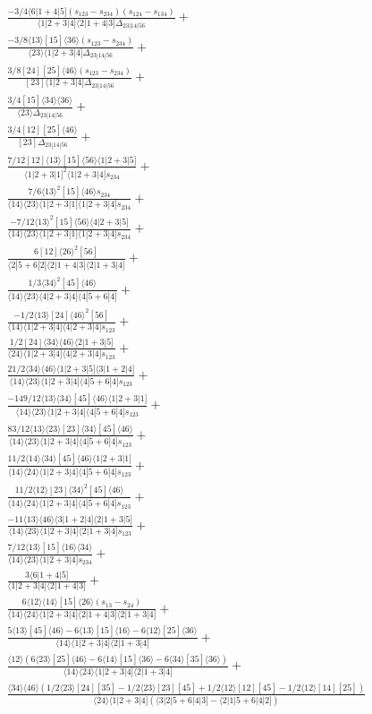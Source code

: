 \documentclass[varwidth, border=5pt]{standalone}
\begin{document}
\begin{my}
$\begin{gathered}
\scriptscriptstyle\frac{-3/4⟨6|1+4|5](s_{123}-s_{234})(s_{124}-s_{134})}{⟨1|2+3|4]⟨2|1+4|3]Δ_{23|14|56}}+\\
\scriptscriptstyle\frac{-3/8⟨13⟩[15]⟨36⟩(s_{123}-s_{234})}{⟨23⟩⟨1|2+3|4]Δ_{23|14|56}}+\\
\scriptscriptstyle\frac{3/8[24][25]⟨46⟩(s_{123}-s_{234})}{[23]⟨1|2+3|4]Δ_{23|14|56}}+\\
\scriptscriptstyle\frac{3/4[15]⟨34⟩⟨36⟩}{⟨23⟩Δ_{23|14|56}}+\\
\scriptscriptstyle\frac{3/4[12][25]⟨46⟩}{[23]Δ_{23|14|56}}+\\
\scriptscriptstyle\frac{7/12[12]⟨13⟩[15]⟨56⟩⟨1|2+3|5]}{⟨1|2+3|1]^2⟨1|2+3|4]s_{234}}+\\
\scriptscriptstyle\frac{7/6⟨13⟩^2[15]⟨46⟩s_{234}}{⟨14⟩⟨23⟩⟨1|2+3|1]⟨1|2+3|4]s_{234}}+\\
\scriptscriptstyle\frac{-7/12⟨13⟩^2[15]⟨56⟩⟨4|2+3|5]}{⟨14⟩⟨23⟩⟨1|2+3|1]⟨1|2+3|4]s_{234}}+\\
\scriptscriptstyle\frac{6[12]⟨26⟩^2[56]}{⟨2|5+6|2]⟨2|1+4|3]⟨2|1+3|4]}+\\
\scriptscriptstyle\frac{1/3⟨34⟩^2[45]⟨46⟩}{⟨14⟩⟨23⟩⟨4|2+3|4]⟨4|5+6|4]}+\\
\scriptscriptstyle\frac{-1/2⟨13⟩[24]⟨46⟩^2[56]}{⟨14⟩⟨1|2+3|4]⟨4|2+3|4]s_{123}}+\\
\scriptscriptstyle\frac{1/2[24]⟨34⟩⟨46⟩⟨2|1+3|5]}{⟨24⟩⟨1|2+3|4]⟨4|2+3|4]s_{123}}+\\
\scriptscriptstyle\frac{21/2⟨34⟩⟨46⟩⟨1|2+3|5]⟨3|1+2|4]}{⟨14⟩⟨23⟩⟨1|2+3|4]⟨4|5+6|4]s_{123}}+\\
\scriptscriptstyle\frac{-149/12⟨13⟩⟨34⟩[45]⟨46⟩⟨1|2+3|1]}{⟨14⟩⟨23⟩⟨1|2+3|4]⟨4|5+6|4]s_{123}}+\\
\scriptscriptstyle\frac{83/12⟨13⟩⟨23⟩[23]⟨34⟩[45]⟨46⟩}{⟨14⟩⟨23⟩⟨1|2+3|4]⟨4|5+6|4]s_{123}}+\\
\scriptscriptstyle\frac{11/2⟨14⟩⟨34⟩[45]⟨46⟩⟨1|2+3|1]}{⟨14⟩⟨24⟩⟨1|2+3|4]⟨4|5+6|4]s_{123}}+\\
\scriptscriptstyle\frac{11/2⟨12⟩[23]⟨34⟩^2[45]⟨46⟩}{⟨14⟩⟨24⟩⟨1|2+3|4]⟨4|5+6|4]s_{123}}+\\
\scriptscriptstyle\frac{-11⟨13⟩⟨46⟩⟨3|1+2|4]⟨2|1+3|5]}{⟨14⟩⟨23⟩⟨1|2+3|4]⟨2|1+3|4]s_{123}}+\\
\scriptscriptstyle\frac{7/12⟨13⟩[15]⟨16⟩⟨34⟩}{⟨14⟩⟨23⟩⟨1|2+3|4]s_{234}}+\\
\scriptscriptstyle\frac{3⟨6|1+4|5]}{⟨1|2+3|4]⟨2|1+4|3]}+\\
\scriptscriptstyle\frac{6⟨12⟩⟨14⟩[15]⟨26⟩(s_{13}-s_{24})}{⟨14⟩⟨24⟩⟨1|2+3|4]⟨2|1+4|3]⟨2|1+3|4]}+\\
\scriptscriptstyle\frac{5⟨13⟩[45]⟨46⟩-6⟨13⟩[15]⟨16⟩-6⟨12⟩[25]⟨36⟩}{⟨14⟩⟨1|2+3|4]⟨2|1+3|4]}+\\
\scriptscriptstyle\frac{⟨12⟩(6⟨23⟩[25]⟨46⟩-6⟨14⟩[15]⟨36⟩-6⟨34⟩[35]⟨36⟩)}{⟨14⟩⟨24⟩⟨1|2+3|4]⟨2|1+3|4]}+\\
\scriptscriptstyle\frac{⟨34⟩⟨46⟩(1/2⟨23⟩[24][35]-1/2⟨23⟩[23][45]+1/2⟨12⟩[12][45]-1/2⟨12⟩[14][25])}{⟨24⟩⟨1|2+3|4](⟨3|2|5+6|4|3]-⟨2|1|5+6|4|2])}\phantom{+}
\end{gathered}$
\end{my}
\end{document}
